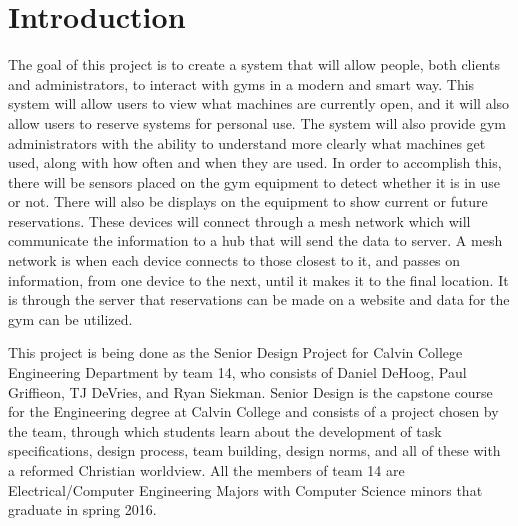 \documentclass[PPFS.tex]{template/subfiles}
\begin{document}
\section{Introduction}

The goal of this project is to create a system that will allow people, both clients and administrators, to interact with gyms in a modern and smart way. This system will allow users to view what machines are currently open, and it will also allow users to reserve systems for personal use. The system will also provide gym administrators with the ability to understand more clearly what machines get used, along with how often and when they are used. In order to accomplish this, there will be sensors placed on the gym equipment to detect whether it is in use or not. There will also be displays on the equipment to show current or future reservations. These devices will connect through a mesh network which will communicate the information to a hub that will send the data to server. A mesh network is when each device connects to those closest to it, and passes on information, from one device to the next, until it makes it to the final location. It is through the server that reservations can be made on a website and data for the gym can be utilized. 

This project is being done as the Senior Design Project for Calvin College Engineering Department by team 14, who consists of Daniel DeHoog, Paul Griffieon, TJ DeVries, and Ryan Siekman. Senior Design is the capstone course for the Engineering degree at Calvin College and consists of a project chosen by the team, through which students learn about the development of task specifications, design process, team building, design norms, and all of these with a reformed Christian worldview. All the members of team 14 are Electrical/Computer Engineering Majors with Computer Science minors that graduate in spring 2016. 
\end{document}
